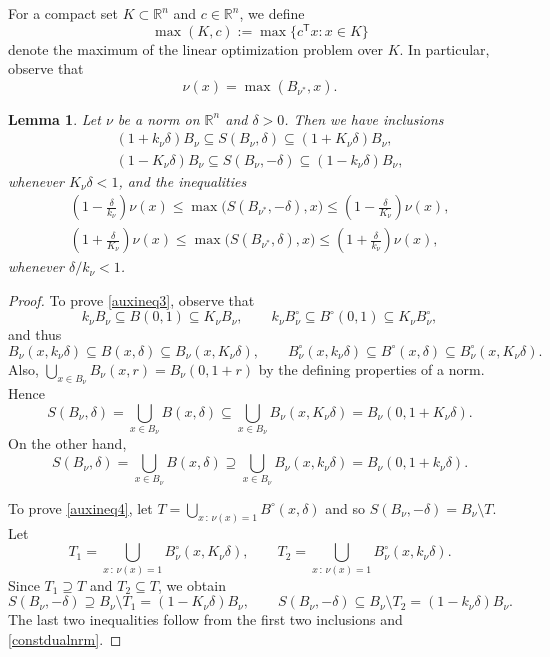 \documentclass[11pt,reqno]{amsart}
\newtheorem{lemma}[theorem]{Lemma}
\theoremstyle{definition}
\theoremstyle{remark}
\begin{document}
For a compact set $K\subset \mathbb{R}^n$ and $c\in \mathbb{R}^n$, we define
\[
\max(K,c):=\max \{c^\mathsf{T} x  :  x \in K\}
\]
denote the maximum of the linear optimization problem over $K$. In particular, observe that 
\[
\nu(x)=\max(B_{\nu^*},x).
\]
\begin{lemma}\label{auxineq}  Let $\nu$ be a norm on $\mathbb{R}^n$ and $\delta>0$.  Then we have inclusions
\begin{gather}
(1+k_\nu\delta)B_\nu\subseteq S(B_\nu,\delta)\subseteq (1+K_\nu\delta)B_\nu,\label{auxineq3}
\\
(1-K_\nu\delta)B_\nu\subseteq S(B_\nu,-\delta)\subseteq (1-k_\nu\delta)B_\nu,\label{auxineq4}
\end{gather}
whenever  $K_\nu\delta< 1$, and the inequalities
\begin{gather}
\label{auxineq1} \left(1-\frac{\delta}{k_\nu}\right)\nu(x) \le \max \bigl(S(B_{\nu^*},-\delta),x\bigr)\le 
\left(1-\frac{\delta}{K_\nu}\right)\nu(x),\\
\label{auxineq2}
\left(1+\frac{\delta}{K_\nu}\right)\nu(x)\le \max \bigl(S(B_{\nu^*},\delta),x\bigr)\le \left(1+\frac{\delta}{k_\nu}\right)\nu(x),
\end{gather}
whenever $\delta/k_\nu< 1$.
\end{lemma}
\begin{proof}  To prove \eqref{auxineq3}, observe that
\[
k_\nu B_\nu\subseteq B(0,1)\subseteq K_\nu B_\nu,\qquad  k_\nu B^\circ_\nu\subseteq B^\circ(0,1)\subseteq K_\nu B^\circ_\nu,
\]
and thus
\[
B_\nu(x,k_\nu \delta) \subseteq B(x,\delta) \subseteq B_\nu(x,K_\nu \delta),\qquad
B^\circ_\nu(x,k_\nu \delta) \subseteq B^\circ(x,\delta) \subseteq B^\circ_\nu(x,K_\nu \delta).
\]
Also, $ \bigcup_{x\in B_\nu} B_\nu(x, r) =B_\nu(0,1+r)$ by the defining properties of a norm. Hence
\[
S(B_\nu,\delta) =\bigcup_{x\in B_\nu} B(x,\delta) \subseteq \bigcup_{x\in B_\nu} B_\nu(x, K_\nu\delta) =B_\nu(0,1+K_\nu\delta).
\]
On the other  hand,
\[
S(B_\nu,\delta) =\bigcup_{x\in B_\nu} B(x,\delta) \supseteq \bigcup_{x\in B_\nu} B_\nu(x, k_\nu\delta)  =B_\nu(0, 1+k_\nu\delta).
\]

To prove  \eqref{auxineq4}, let $T=\bigcup_{x\, : \,\nu(x)=1} B^\circ(x,\delta)$ and so $S(B_\nu,-\delta)=B_\nu\setminus T$.
Let 
\[T_1=\bigcup_{x\, : \,\nu(x)=1}B^\circ_\nu(x, K_\nu\delta), \qquad T_2=\bigcup_{x\, : \, \nu(x)=1} 
B^\circ_\nu(x, k_\nu\delta).
\]
Since $T_1\supseteq T$ and $T_2\subseteq T$, we obtain
\[
S(B_\nu,-\delta)\supseteq B_\nu\setminus T_1 = (1-K_\nu\delta)B_\nu,
\qquad
S(B_\nu,-\delta)\subseteq B_\nu\setminus T_2 =(1-k_\nu\delta)B_\nu.
\]
The last two inequalities follow from the first two inclusions and \eqref{constdualnrm}.
\end{proof}
\end{document}
